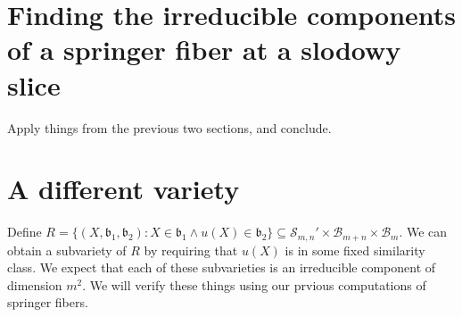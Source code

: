 \documentclass[12pt,psamsfonts]{article}
\begin{document}
\section{Finding the irreducible components of a springer fiber at a slodowy slice}
Apply things from the previous two sections, and conclude.

\section{A different variety}
Define \(R = \{(X, \mathfrak{b}_1, \mathfrak{b}_2) : X \in \mathfrak{b}_1 \land u(X) \in \mathfrak{b}_2\} \subseteq \mathcal{S}_{m,n}' \times \mathcal{B}_{m + n} \times \mathcal{B}_m\).
We can obtain a subvariety of \(R\) by requiring that \(u(X)\) is in some fixed similarity class.
We expect that each of these subvarieties is an irreducible component of dimension \(m^2\).
We will verify these things using our prvious computations of springer fibers.


\end{document}
